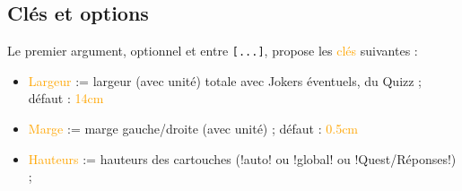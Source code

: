 \documentclass[french,a4paper,11pt]{article}
\newcommand\Cle[1]{{\small\sffamily\textlangle \textcolor{orange}{#1}\textrangle}}
\begin{document}
\begin{DemoCode}[]
\QuizzMillions{\lipsum[1][1-2]}
	{\lipsum[2][1]}{\lipsum[2][2]}{\lipsum[2][3]}{\lipsum[2][5]}
\end{DemoCode}

\subsection{Clés et options}

\begin{tipblock}
Le premier argument, optionnel et entre \texttt{[...]}, propose les \Cle{clés} suivantes :

\begin{itemize}
	\item \Cle{Largeur} := largeur (avec unité) totale avec Jokers éventuels, du Quizz ; \hfill{}défaut : \Cle{14cm}
	\item \Cle{Marge} := marge gauche/droite (avec unité) ; \hfill{}défaut : \Cle{0.5cm}
	\item \Cle{Hauteurs} := hauteurs des cartouches (\motcletex!auto! ou \motcletex!global! ou \motcletex!Quest/Réponses!) ;
	

\end{itemize}
\end{tipblock}
\end{document}
